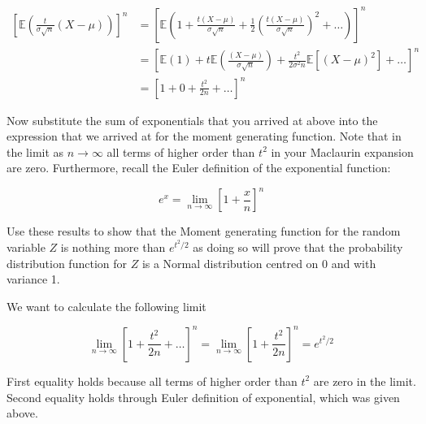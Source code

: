 \documentclass[paper=a4, fontsize=11pt]{scrartcl}
\newcommand{\red}[1]{{\color{red}#1}}
\numberwithin{equation}{section}
\numberwithin{figure}{section}
\numberwithin{table}{section}
\begin{document}
\begin{answers}
\red{
\begin{equation}
\begin{aligned}
 \left[  \mathbb{E}\left(  \frac{t}{\sigma\sqrt{n}} (X-\mu) \right) \right]^n &
= \left[ \mathbb{E}\left(  1 + \frac{t(X-\mu)}{\sigma \sqrt{n}} + \frac{1}{2}
\left( \frac{t(X-\mu)}{\sigma \sqrt{n}}\right)^2 + \dots \right) \right]^n \\
  & = \left[ \mathbb{E}(1) + t \mathbb{E}\left( \frac{(X-\mu)}{\sigma \sqrt{n}}
\right) + \frac{t^2}{2\sigma^2 n} \mathbb{E} \left[ \left(X-\mu\right)^2 \right]
+ \dots  \right]^n \\
  & = \left[ 1 + 0 + \frac{t^2}{2n} + \dots \right]^n
 \end{aligned} 
\end{equation}
}
\end{answers}

\clearpage

\noindent Now substitute the sum of exponentials that you arrived at above into
the expression that we arrived at for the moment generating function.  Note
that in the limit as $n\rightarrow \infty$ all terms of higher order than $t^2$
in your Maclaurin expansion are zero.  Furthermore, recall the Euler definition
of the exponential function:

\begin{equation}
 e^x = \lim_{n\rightarrow \infty}  \left[ 1 + \frac{x}{n} \right]^n 
\end{equation}

\noindent Use these results to show that the Moment generating function for the
random variable $Z$ is nothing more than $e^{t^2/2}$ as doing so will prove that
the probability distribution function for $Z$ is a Normal distribution centred
on 0 and with variance 1.

\begin{answers}
\red{
\vspace{0.25cm}
We want to calculate the following limit 

\begin{equation}
\lim_{n \rightarrow \infty}  \left[ 1 + \frac{t^2}{2n} + \dots \right]^n =
\lim_{n \rightarrow \infty}  \left[ 1 + \frac{t^2}{2n} \right]^n = e^{t^2/2}
\end{equation}

First equality holds because all terms of higher order than $t^2$ are zero in
the limit.  Second equality holds through Euler definition of exponential, which
was given above.
}
\end{answers}
\end{document}
